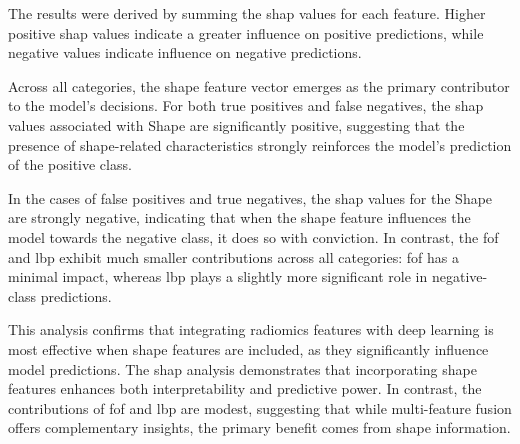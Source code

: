The results were derived by summing the \ac{shap} values for each feature. Higher positive \ac{shap} values indicate a greater influence on positive predictions, while negative values indicate influence on negative predictions.

Across all categories, the shape feature vector emerges as the primary contributor to the model's decisions. For both true positives and false negatives, the \ac{shap} values associated with Shape are significantly positive, suggesting that the presence of shape-related characteristics strongly reinforces the model's prediction of the positive class.

In the cases of false positives and true negatives, the \ac{shap} values for the Shape are strongly negative, indicating that when the shape feature influences the model towards the negative class, it does so with conviction. In contrast, the \ac{fof} and \ac{lbp} exhibit much smaller contributions across all categories: \ac{fof} has a minimal impact, whereas \ac{lbp} plays a slightly more significant role in negative-class predictions. 

This analysis confirms that integrating radiomics features with deep learning is most effective when shape features are included, as they significantly influence model predictions. The \ac{shap} analysis demonstrates that incorporating shape features enhances both interpretability and predictive power. In contrast, the contributions of \ac{fof} and \ac{lbp} are modest, suggesting that while multi-feature fusion offers complementary insights, the primary benefit comes from shape information. 